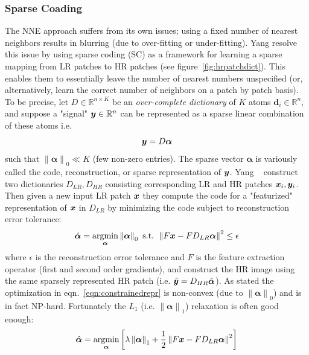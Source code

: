 \subsubsection{Sparse Coading}
The NNE approach suffers from its own issues; using a fixed number of nearest neighbors results in blurring (due to over-fitting or under-fitting).
%
Yang \etal\cite{yang2008} resolve this issue by using sparse coding (SC) as a framework for learning a sparse mapping from LR patches to HR patches (see figure~\ref{fig:hrpatchdict}).
%
This enables them to essentially leave the number of nearest numbers unspecified (or, alternatively, learn the correct number of neighbors on a patch by patch basis).
%
To be precise, let $D \in \mathbb{R}^{n \times K}$ be an \textit{over-complete dictionary} of $K$ atoms $\bm{d}_i \in \mathbb{R}^n$, and suppose a "signal" $\bm{y} \in \mathbb{R}^n$ can be represented as a sparse linear combination of these atoms i.e.
\begin{equation}
	\bm{y} = D\bm{\alpha}
\end{equation}
such that $\left\| \bm{\alpha} \right\|_0 \ll K$ (few non-zero entries).
%
The sparse vector $\bm{\alpha}$ is variously called the code, reconstruction, or sparse representation of $\bm{y}$.
%
Yang \etal~ construct two dictionaries $D_{LR}, D_{HR}$ consisting corresponding LR and HR patches $\bm{x}_i, \bm{y}_i$.
%
Then given a new input LR patch $\bm{x}$ they compute the code for a "featurized" representation of $\bm{x}$ in $D_{LR}$ by minimizing the code subject to reconstruction error tolerance:
\begin{equation}
	\hat{\bm{\alpha}} = \underset{\bm{\alpha}}{\text{argmin}} \left\| \bm{\alpha} \right\|_0 \text{ s.t. } \left\| F\bx - FD_{LR}\bm{\alpha} \right\|^2 \leq \epsilon
	\label{eqn:constrainedrepr}
\end{equation}
where $\epsilon$ is the reconstruction error tolerance and $F$ is the feature extraction operator (first and second order gradients), and construct the HR image using the same sparsely represented HR patch (i.e. $\hat{\bm{y}} = D_{HR} \hat{\bm{\alpha}}$).
%
As stated the optimization in eqn.~\eqref{eqn:constrainedrepr} is non-convex (due to $\left\| \bm{\alpha} \right\|_0$) and is in fact NP-hard\cite{tilman2015}.
%
Fortunately the $L_1$ (i.e. $\left\| \bm{\alpha} \right\|_1$) relaxation is often good enough\cite{Donoho9446}:
\begin{equation}
	\hat{\bm{\alpha}} = \underset{\bm{\alpha}}{\text{argmin}} \left[ \lambda\left\| \bm{\alpha} \right\|_1 + \frac{1}{2}\left\| F\bx - FD_{LR}\bm{\alpha} \right\|^2 \right]
	\label{eqn:lagrangerepr}
\end{equation}
